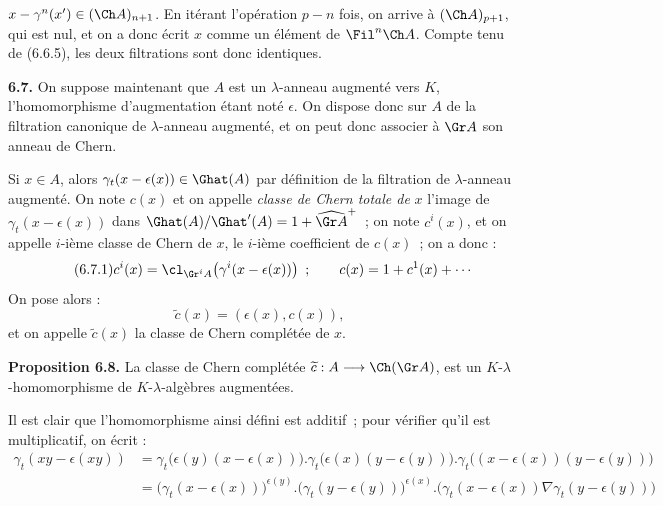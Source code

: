 \(x-\gamma^n(x')\in(\Ch A)_{n+1}\). En
itérant l'opération \(p-n\) fois, on arrive à \((\Ch A)_{p+1}\), qui est nul, et on a donc écrit \(x\) comme un élément de \(\Fil^n\Ch A\). Compte tenu de (6.6.5), les deux filtrations sont donc identiques.

\textbf{6.7.} On suppose maintenant que \(A\) est un \(\lambda\)-anneau augmenté vers \(K\), l'homomorphisme d'augmentation étant noté \(\epsilon\). On dispose donc sur \(A\) de la filtration canonique de \(\lambda\)-anneau augmenté, et on peut donc associer à \(\Gr A\) son anneau de Chern.

Si \(x\in A\), alors \(\gamma_t(x-\epsilon(x))\in\Ghat(A)\) par définition de la filtration de \(\lambda\)-anneau augmenté. On note \(c(x)\) et on appelle \emph{classe de Chern totale de} \(x\) l'image de \(\gamma_t(x-\epsilon(x))\) dans \(\Ghat(A)/\Ghat'(A)=1+\widehat{\Gr A}^{+}\)~; on note \(c^i(x)\), et on appelle \(i\)-ième classe de Chern de \(x\), le \(i\)-ième coefficient de \(c(x)\)~; on a donc :
\begin{equation}\tag{6.7.1}
  c^i(x)=\cl_{\Gr^iA}\!\left(\gamma^i(x-\epsilon(x))\right)~;\qquad
  c(x)=1+c^1(x)+\cdots
\end{equation}
On pose alors :
\begin{equation}\tag{6.7.2}
  \widetilde c(x)=(\epsilon(x),c(x)),
\end{equation}
et on appelle \(\widetilde c(x)\) la classe de Chern complétée de \(x\).

\textbf{Proposition 6.8.} La classe de Chern complétée \(\widetilde c:A\longrightarrow\Ch(\Gr A)\), est un \(K\)-\(\lambda\)-homomorphisme de \(K\)-\(\lambda\)-algèbres augmentées.

Il est clair que l'homomorphisme ainsi défini est additif~; pour vérifier qu'il est multiplicatif, on écrit :
\[
\begin{aligned}
\gamma_t(xy-\epsilon(xy))
&=\gamma_t\bigl(\epsilon(y)(x-\epsilon(x))\bigr).
  \gamma_t\bigl(\epsilon(x)(y-\epsilon(y))\bigr).
  \gamma_t\bigl((x-\epsilon(x))(y-\epsilon(y))\bigr)\\
&=\bigl(\gamma_t(x-\epsilon(x))\bigr)^{\epsilon(y)}.
  \bigl(\gamma_t(y-\epsilon(y))\bigr)^{\epsilon(x)}.
  \bigl(\gamma_t(x-\epsilon(x))\nabla\gamma_t(y-\epsilon(y))\bigr)
\end{aligned}
\]
